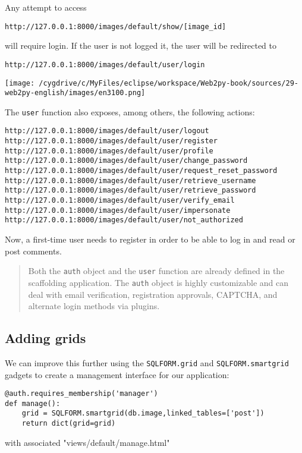 \documentclass[justified,sixbynine,notoc]{tufte-book}
\def\ft{\small\tt}
\begin{document}
\begin{fullwidth}
Any attempt to access
\begin{lstlisting}[keywords={}]
http://127.0.0.1:8000/images/default/show/[image_id]
\end{lstlisting}
\noindent will require login. If the user is not logged it, the user will be redirected to
\begin{lstlisting}[keywords={}]
http://127.0.0.1:8000/images/default/user/login
\end{lstlisting}


\goodbreak\begin{center}\texttt{[image: /cygdrive/c/MyFiles/eclipse/workspace/Web2py-book/sources/29-web2py-english/images/en3100.png]}\end{center}


The {\ft user} function also exposes, among others, the following actions:
\begin{lstlisting}[keywords={}]
http://127.0.0.1:8000/images/default/user/logout
http://127.0.0.1:8000/images/default/user/register
http://127.0.0.1:8000/images/default/user/profile
http://127.0.0.1:8000/images/default/user/change_password
http://127.0.0.1:8000/images/default/user/request_reset_password
http://127.0.0.1:8000/images/default/user/retrieve_username
http://127.0.0.1:8000/images/default/user/retrieve_password
http://127.0.0.1:8000/images/default/user/verify_email
http://127.0.0.1:8000/images/default/user/impersonate
http://127.0.0.1:8000/images/default/user/not_authorized
\end{lstlisting}

Now, a first-time user needs to register in order to be able to log in and read or post comments.

\begin{quote}Both the {\ft auth} object and the {\ft user} function are already defined in the scaffolding application. The {\ft auth} object is highly customizable and can deal with email verification, registration approvals, CAPTCHA, and alternate login methods via plugins.\end{quote}
\goodbreak\subsection{Adding grids}

We can improve this further using the {\ft SQLFORM.grid} and {\ft SQLFORM.smartgrid} gadgets to create a management interface for our application:

\begin{lstlisting}
@auth.requires_membership('manager')
def manage():
    grid = SQLFORM.smartgrid(db.image,linked_tables=['post'])
    return dict(grid=grid)
\end{lstlisting}
\noindent with associated "views/default/manage.html"


\end{fullwidth}
\end{document}
